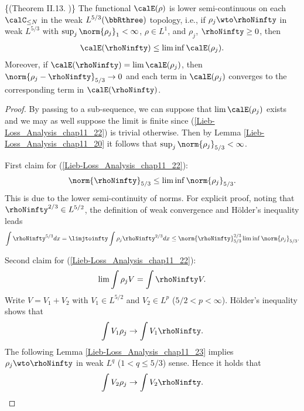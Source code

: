 \documentclass[openany, a4paper, oneside]{jsbook}
\begin{document}
\begin{lem}\textup\{(Theorem II.13. \cite{LiebSimon1})\}\label{Lieb-Loss_Analysis_chap11_24}
 The functional $\calE (\rho)$ is lower semi-continuous on each $\calC_{\leq N}$ in the weak $L^{5/3} (\bbRthree)$ topology, i.e.,
 if $\rho_j \wto \rhoNinfty$ in weak $L^{5/3}$ with $\sup_j \norm{\rho_j}_1 < \infty$, $\rho \in L^1$, and $\rho_j$, $\rhoNinfty \geq 0$,
 then
\begin{align}
 \calE (\rhoNinfty)
 \leq
 \liminf \calE (\rho_j). \label{Lieb-Loss_Analysis_chap11_22}
\end{align}
Moreover, if $\calE (\rhoNinfty) = \lim \calE (\rho_j)$, then $\norm{\rho_j - \rhoNinfty}_{5/3} \to 0$ and
each term in $\calE (\rho_j)$ converges to the corresponding term in $\calE (\rhoNinfty)$.
\end{lem}
\begin{proof}
By passing to a sub-sequence, we can suppose that $\lim \calE (\rho_j)$ exists and we may as well suppose the limit is finite
since (\ref{Lieb-Loss_Analysis_chap11_22}) is trivial otherwise.
Then by Lemma \ref{Lieb-Loss_Analysis_chap11_20} it follows that $\sup_j \norm{\rho_j}_{5/3} < \infty$.

First claim for (\ref{Lieb-Loss_Analysis_chap11_22}):
\begin{align}
 \norm{\rhoNinfty}_{5/3}
 \leq
 \liminf \norm{\rho_j}_{5/3}.
\end{align}
This is due to the lower semi-continuity of norms.
For explicit proof, noting that $\rhoNinfty^{2/3} \in L^{5/2}$, the definition of weak convergence and H\"older's inequality leads
\begin{align}
 \int \rhoNinfty^{5/3} dx
 =
 \limjtoinfty \int \rho_j \rhoNinfty^{2/3} dx
 \leq
 \norm{\rhoNinfty}_{5/3}^{2/3} \liminf \norm{\rho_j}_{5/3}.
\end{align}

Second claim for (\ref{Lieb-Loss_Analysis_chap11_22}):
\begin{align}
 \lim \int \rho_j V
 =
 \int \rhoNinfty V.
\end{align}
Write $V = V_1 + V_2$ with $V_1 \in L^{5/2}$ and $V_2 \in L^p$ ($5/2 < p < \infty$).
H\"older's inequality shows that
\begin{align}
 \int V_1 \rho_j \to \int V_1 \rhoNinfty.
\end{align}
The following Lemma \ref{Lieb-Loss_Analysis_chap11_23} implies $\rho_j \wto \rhoNinfty$ in weak $L^q$ ($1 < q \leq 5/3$) sense.
Hence it holds that
\begin{align}
 \int V_2 \rho_j \to \int V_2 \rhoNinfty.
\end{align}


\end{proof}
\end{document}
